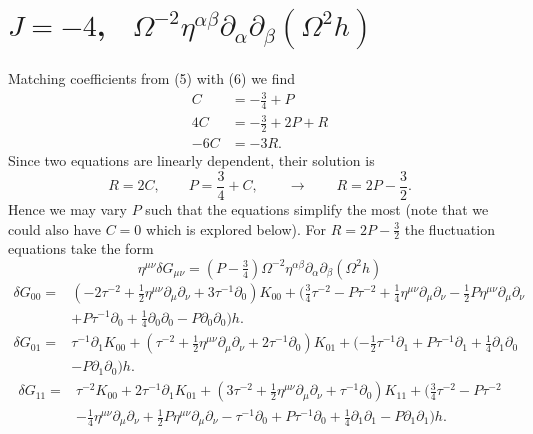 \documentclass[10pt,letterpaper]{article}
\begin{document}
\section*{ $J=-4$, \ $\Omega^{-2}\eta^{\alpha\beta}\partial_\alpha\partial_\beta (\Omega^2 h)$}
Matching coefficients from (5) with (6) we find
\begin{align}
	C &= -\frac34 + P\\
	4C &= -\frac32 + 2P+R\\
	-6C &= -3R.
\end{align}
 Since two equations are linearly dependent, their solution is
\begin{equation}
	R=2C,\qquad P=\frac34+C,\qquad\to\qquad R = 2P-\frac32.
\end{equation}
Hence we may vary $P$ such that the equations simplify the most (note that we could also have $C=0$ which is explored below). For $R = 2P-\tfrac32$ the fluctuation equations take the form
\begin{equation}
\eta^{\mu\nu}\delta G_{\mu\nu} =(P-\tfrac34) \Omega^{-2}\eta^{\alpha\beta}\partial_\alpha\partial_\beta (\Omega^{2} h)
\end{equation}
\begin{align}
\delta G_{00}={}&(-2 \tau^{-2}
 + \tfrac{1}{2} \eta^{\mu \nu} \partial_{\mu} \partial_{\nu}
 + 3 \tau^{-1} \partial_{0}) K_{00}
 + (\tfrac{3}{4} \tau^{-2}
 -  P \tau^{-2}
 + \tfrac{1}{4} \eta^{\mu \nu} \partial_{\mu} \partial_{\nu}
 -  \tfrac{1}{2} P \eta^{\mu \nu} \partial_{\mu} \partial_{\nu}\nonumber\\
& + P \tau^{-1} \partial_{0}
 + \tfrac{1}{4} \partial_{0} \partial_{0}
 -  P \partial_{0} \partial_{0}) h.
\end{align}
\begin{align}
\delta G_{01}={}&\tau^{-1} \partial_{1} K_{00}
 + (\tau^{-2}
 + \tfrac{1}{2} \eta^{\mu \nu} \partial_{\mu} \partial_{\nu}
 + 2 \tau^{-1} \partial_{0}) K_{01}
 + (- \tfrac{1}{2} \tau^{-1} \partial_{1}
 + P \tau^{-1} \partial_{1}
 + \tfrac{1}{4} \partial_{1} \partial_{0}\nonumber\\
& -  P \partial_{1} \partial_{0}) h.
\end{align}
\begin{align}
\delta G_{11}={}&\tau^{-2} K_{00}
 + 2 \tau^{-1} \partial_{1} K_{01}
 + (3 \tau^{-2}
 + \tfrac{1}{2} \eta^{\mu \nu} \partial_{\mu} \partial_{\nu}
 + \tau^{-1} \partial_{0}) K_{11}
 + (\tfrac{3}{4} \tau^{-2}
 -  P \tau^{-2}\nonumber\\
& -  \tfrac{1}{4} \eta^{\mu \nu} \partial_{\mu} \partial_{\nu}
 + \tfrac{1}{2} P \eta^{\mu \nu} \partial_{\mu} \partial_{\nu}
 -  \tau^{-1} \partial_{0}
 + P \tau^{-1} \partial_{0}
 + \tfrac{1}{4} \partial_{1} \partial_{1}
 -  P \partial_{1} \partial_{1}) h.
\end{align}
\end{document}
